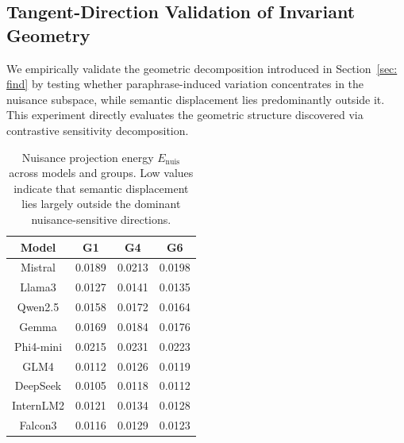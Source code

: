 \subsection{Tangent-Direction Validation of Invariant Geometry}
\label{sec: tangetD}

We empirically validate the geometric decomposition introduced in Section~\ref{sec: find} by testing whether paraphrase-induced variation concentrates in the nuisance subspace, while semantic displacement lies predominantly outside it. This experiment directly evaluates the geometric structure discovered via contrastive sensitivity decomposition. 

\begin{table}
\vspace{-1.0em}
\centering
\footnotesize
\setlength{\tabcolsep}{4pt}
\renewcommand{\arraystretch}{1.2}
\begin{tabular}{c|ccc}
\hline
Model 
& G1 
& G4 
& G6 \\
\hline

Mistral 
& 0.0189 & 0.0213 & 0.0198 \\

Llama3 
& 0.0127 & 0.0141 & 0.0135 \\

Qwen2.5
& 0.0158 & 0.0172 & 0.0164 \\

Gemma
& 0.0169 & 0.0184 & 0.0176 \\

Phi4-mini
& 0.0215 & 0.0231 & 0.0223 \\

GLM4
& 0.0112 & 0.0126 & 0.0119 \\

DeepSeek
& 0.0105 & 0.0118 & 0.0112 \\

InternLM2
& 0.0121 & 0.0134 & 0.0128 \\

Falcon3
& 0.0116 & 0.0129 & 0.0123 \\

\hline
\end{tabular}
\caption{Nuisance projection energy $E_{\mathrm{nuis}}$ across models and groups. Low values indicate that semantic displacement lies largely outside the dominant nuisance-sensitive directions.}
\label{tab:energy}
\vspace{-2.0em}
\end{table}

